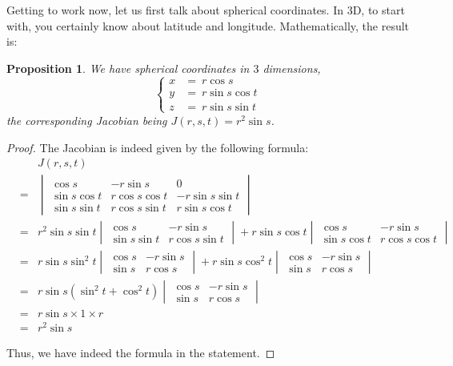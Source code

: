 \documentclass[12pt]{amsbook}
\newtheorem{proposition}[theorem]{Proposition}
\begin{document}
\bigskip

Getting to work now, let us first talk about spherical coordinates. In 3D, to start with, you certainly know about latitude and longitude. Mathematically, the result is:


\begin{proposition}
We have spherical coordinates in $3$ dimensions,
$$\begin{cases}
x\!\!\!&=\ r\cos s\\
y\!\!\!&=\ r\sin s\cos t\\
z\!\!\!&=\ r\sin s\sin t
\end{cases}$$
the corresponding Jacobian being $J(r,s,t)=r^2\sin s$.
\end{proposition}

\begin{proof}
The Jacobian is indeed given by the following formula:
\begin{eqnarray*}
&&J(r,s,t)\\
&=&\begin{vmatrix}
\cos s&-r\sin s&0\\
\sin s\cos t&r\cos s\cos t&-r\sin s\sin t\\
\sin s\sin t&r\cos s\sin t&r\sin s\cos t
\end{vmatrix}\\
&=&r^2\sin s\sin t
\begin{vmatrix}\cos s&-r\sin s\\ \sin s\sin t&r\cos s\sin t\end{vmatrix}
+r\sin s\cos t\begin{vmatrix}\cos s&-r\sin s\\ \sin s\cos t&r\cos s\cos t\end{vmatrix}\\
&=&r\sin s\sin^2 t
\begin{vmatrix}\cos s&-r\sin s\\ \sin s&r\cos s\end{vmatrix}
+r\sin s\cos^2 t\begin{vmatrix}\cos s&-r\sin s\\ \sin s&r\cos s\end{vmatrix}\\
&=&r\sin s(\sin^2t+\cos^2t)\begin{vmatrix}\cos s&-r\sin s\\ \sin s&r\cos s\end{vmatrix}\\
&=&r\sin s\times 1\times r\\
&=&r^2\sin s
\end{eqnarray*}

Thus, we have indeed the formula in the statement.
\end{proof}
\end{document}
